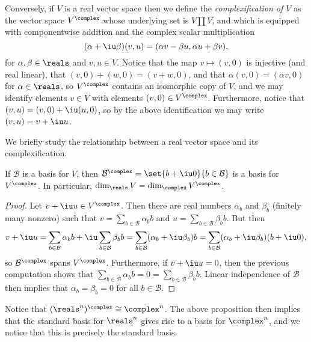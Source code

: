 \documentclass[article, a4paper, 11pt, oneside]{memoir}
\numberwithin{equation}{chapter}
\begin{document}
Conversely, if $V$ is a real vector space then we define the \emph{complexification of $V$} as the vector space $V^\complex$ whose underlying set is $V \prod V$, and which is equipped with componentwise addition and the complex scalar multiplication
%
\begin{equation*}
    (\alpha + \iu \beta)(v,u)
        = (\alpha v - \beta u, \alpha u + \beta v),
\end{equation*}
%
for $\alpha,\beta \in \reals$ and $v,u \in V$. Notice that the map $v \mapsto (v,0)$ is injective (and real linear), that $(v,0) + (w,0) = (v+w,0)$, and that $\alpha(v,0) = (\alpha v,0)$ for $\alpha \in \reals$, so $V^\complex$ contains an isomorphic copy of $V$, and we may identify elements $v \in V$ with elements $(v,0) \in V^\complex$. Furthermore, notice that $(v,u) = (v,0) + \iu (u,0)$, so by the above identification we may write $(v,u) = v + \iu u$.

We briefly study the relationship between a real vector space and its complexification.

\newcommand{\calB}{\mathcal{B}}

\begin{proposition}
    If $\calB$ is a basis for $V$, then $\calB^\complex = \set{b + \iu 0}{b \in \calB}$ is a basis for $V^\complex$. In particular, $\dim_\reals V = \dim_\complex V^\complex$.
\end{proposition}

\begin{proof}
    Let $v + \iu u \in V^\complex$. Then there are real numbers $\alpha_b$ and $\beta_b$ (finitely many nonzero) such that $v = \sum_{b \in \calB} \alpha_b b$ and $u = \sum_{b \in \calB} \beta_b b$. But then
    \begin{equation*}
        v + \iu u
            = \sum_{b \in \calB} \alpha_b b
                + \iu \sum_{b \in \calB} \beta_b b
            = \sum_{b \in \calB} (\alpha_b + \iu \beta_b) b
            = \sum_{b \in \calB} (\alpha_b + \iu \beta_b) (b + \iu 0),
    \end{equation*}
    so $\calB^\complex$ spans $V^\complex$. Furthermore, if $v + \iu u = 0$, then the previous computation shows that $\sum_{b \in \calB} \alpha_b b = 0 = \sum_{b \in \calB} \beta_b b$. Linear independence of $\calB$ then implies that $\alpha_b = \beta_b = 0$ for all $b \in \calB$.
\end{proof}

\begin{example}
    Notice that $(\reals^n)^\complex \cong \complex^n$. The above proposition then implies that the standard basis for $\reals^n$ gives rise to a basis for $\complex^n$, and we notice that this is precisely the standard basis.
\end{example}
\end{document}
